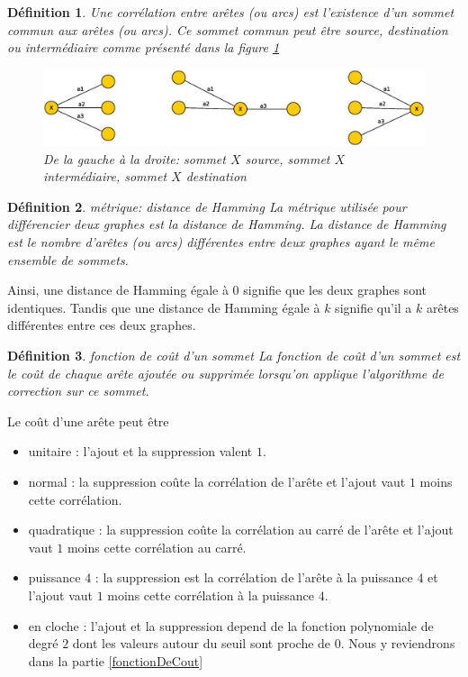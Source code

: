 \documentclass[onecolumn, 12pt]{book}
\newtheorem{definition}{D\'efinition}
\begin{document}
\begin{definition}
Une corr\'elation entre ar\^etes (ou arcs) est l'existence d'un sommet commun aux ar\^etes (ou arcs). 
Ce sommet commun peut \^etre source, destination ou interm\'ediaire comme pr\'esent\'e dans la figure \ref{typeSommetEnCommun}
\begin{centering} 
\begin{figure}[htb!] 
\includegraphics[scale=0.50]{images/typeSommetsEnCommun.eps}
\caption{De la gauche \`a la droite: sommet $X$ source, sommet $X$ interm\'ediaire, sommet $X$ destination}
\label{typeSommetEnCommun} 
\end{figure}
\end{centering} 
\end{definition}

\begin{definition}{ m\'etrique: distance de Hamming} \newline
La m\'etrique utilis\'ee pour diff\'erencier deux graphes est la {\em distance de Hamming}.
La distance de Hamming est le nombre d'ar\^etes (ou arcs) diff\'erentes entre deux graphes ayant le m\^eme ensemble de sommets. 
\end{definition}
Ainsi, une distance de Hamming \'egale \`a $0$ signifie que les deux graphes sont identiques. Tandis que  une distance de Hamming \'egale \`a $k$ signifie qu'il a $k$ ar\^etes diff\'erentes entre ces deux graphes.

\begin{definition}{ fonction de co\^ut d'un sommet} \newline
La fonction de co\^ut d'un sommet est le co\^ut de chaque ar\^ete ajout\'ee ou supprim\'ee lorsqu'on applique l'algorithme de correction sur ce sommet.
\end{definition}
Le co\^ut d'une ar\^ete peut \^etre
\begin{itemize}
	\item unitaire : l'ajout et la suppression valent $1$.
	\item normal : la suppression co\^ute la corr\'elation de l'ar\^ete et l'ajout vaut  $1$ moins cette corr\'elation.
	\item quadratique : la suppression co\^ute la corr\'elation au carr\'e de l'ar\^ete et l'ajout vaut  $1$ moins cette corr\'elation au carr\'e.
	\item puissance $4$ :  la suppression est la corr\'elation de l'ar\^ete \`a la puissance $4$ et l'ajout vaut  $1$ moins cette corr\'elation \`a la puissance $4$.
	\item en cloche : l'ajout et la suppression depend de la fonction polynomiale de degr\'e $2$ dont les valeurs autour du seuil sont proche de $0$. Nous y reviendrons dans la partie \ref{fonctionDeCout} 
\end{itemize}
\end{document}
